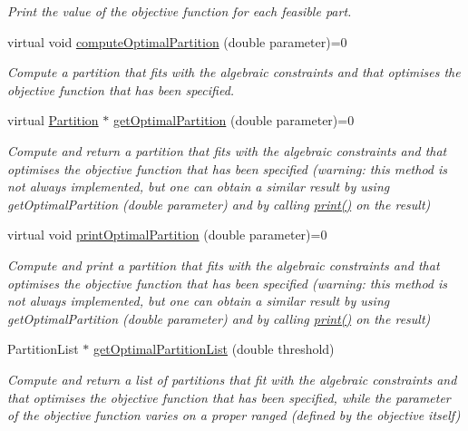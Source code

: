 \begin{DoxyCompactItemize}
\begin{DoxyCompactList}\small\item\em Print the value of the objective function for each feasible part. \end{DoxyCompactList}\item 
virtual void \hyperlink{classAbstractSet_acfc3004f18192f38e32bb7a5a12ec8df}{compute\-Optimal\-Partition} (double parameter)=0
\begin{DoxyCompactList}\small\item\em Compute a partition that fits with the algebraic constraints and that optimises the objective function that has been specified. \end{DoxyCompactList}\item 
virtual \hyperlink{classPartition}{Partition} $\ast$ \hyperlink{classAbstractSet_a48fd08c4b61ed46946bed6e19cd11194}{get\-Optimal\-Partition} (double parameter)=0
\begin{DoxyCompactList}\small\item\em Compute and return a partition that fits with the algebraic constraints and that optimises the objective function that has been specified (warning\-: this method is not always implemented, but one can obtain a similar result by using get\-Optimal\-Partition (double parameter) and by calling \hyperlink{classAbstractSet_ae20f14f4e4209570d26c3614c00e02df}{print()} on the result) \end{DoxyCompactList}\item 
virtual void \hyperlink{classAbstractSet_a82a9ce5c2d30690f0d1b83b034e92e1e}{print\-Optimal\-Partition} (double parameter)=0
\begin{DoxyCompactList}\small\item\em Compute and print a partition that fits with the algebraic constraints and that optimises the objective function that has been specified (warning\-: this method is not always implemented, but one can obtain a similar result by using get\-Optimal\-Partition (double parameter) and by calling \hyperlink{classAbstractSet_ae20f14f4e4209570d26c3614c00e02df}{print()} on the result) \end{DoxyCompactList}\item 
Partition\-List $\ast$ \hyperlink{classAbstractSet_af92c6c087fdb14e2426a1bf30960195e}{get\-Optimal\-Partition\-List} (double threshold)
\begin{DoxyCompactList}\small\item\em Compute and return a list of partitions that fit with the algebraic constraints and that optimises the objective function that has been specified, while the parameter of the objective function varies on a proper ranged (defined by the objective itself) \end{DoxyCompactList}\item 

\end{DoxyCompactItemize}
